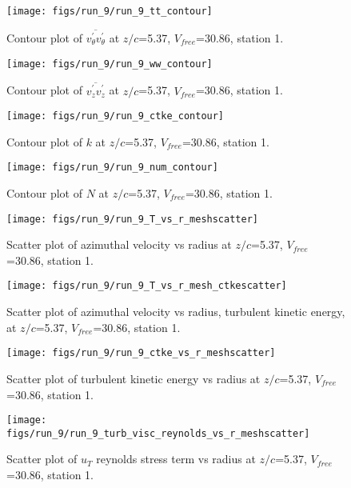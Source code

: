 \begin{figure}[H]
\centering
\texttt{[image: figs/run\_9/run\_9\_tt\_contour]}
\caption{Contour plot of $\overline{v_{\theta}^{\prime} v_{\theta}^{\prime}}$ at $z/c$=5.37, $V_{free}$=30.86, station 1.}
\end{figure}


\begin{figure}[H]
\centering
\texttt{[image: figs/run\_9/run\_9\_ww\_contour]}
\caption{Contour plot of $\overline{v_{z}^{\prime} v_{z}^{\prime}}$ at $z/c$=5.37, $V_{free}$=30.86, station 1.}
\end{figure}


\begin{figure}[H]
\centering
\texttt{[image: figs/run\_9/run\_9\_ctke\_contour]}
\caption{Contour plot of $k$ at $z/c$=5.37, $V_{free}$=30.86, station 1.}
\end{figure}


\begin{figure}[H]
\centering
\texttt{[image: figs/run\_9/run\_9\_num\_contour]}
\caption{Contour plot of $N$ at $z/c$=5.37, $V_{free}$=30.86, station 1.}
\end{figure}


\begin{figure}[H]
\centering
\texttt{[image: figs/run\_9/run\_9\_T\_vs\_r\_meshscatter]}
\caption{Scatter plot of azimuthal velocity vs radius at $z/c$=5.37, $V_{free}$=30.86, station 1.}
\end{figure}


\begin{figure}[H]
\centering
\texttt{[image: figs/run\_9/run\_9\_T\_vs\_r\_mesh\_ctkescatter]}
\caption{Scatter plot of azimuthal velocity vs radius, turbulent kinetic energy, at $z/c$=5.37, $V_{free}$=30.86, station 1.}
\end{figure}


\begin{figure}[H]
\centering
\texttt{[image: figs/run\_9/run\_9\_ctke\_vs\_r\_meshscatter]}
\caption{Scatter plot of turbulent kinetic energy vs radius at $z/c$=5.37, $V_{free}$=30.86, station 1.}
\end{figure}


\begin{figure}[H]
\centering
\texttt{[image: figs/run\_9/run\_9\_turb\_visc\_reynolds\_vs\_r\_meshscatter]}
\caption{Scatter plot of $
u_T$ reynolds stress term vs radius at $z/c$=5.37, $V_{free}$=30.86, station 1.}
\end{figure}


